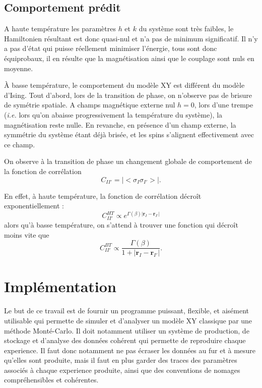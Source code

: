 \documentclass[a4paper, openany, 11pt]{article}
\newcommand{\vr}{\bm{r}}
\begin{document}
\subsection{Comportement prédit}

A haute température les paramètres $h$ et $k$ du système sont très faibles, le Hamiltonien résultant
est donc quasi-nul et n'a pas de minimum significatif. Il n'y a pas d'état qui puisse réellement
minimiser l'énergie, tous sont donc équiprobaux, il en résulte que la magnétisation ainsi que le
couplage sont nuls en moyenne.

À basse température, le comportement du modèle XY est différent du modèle d'Ising. Tout d'abord, lors
de la transition de phase, on n'observe pas de brisure de symétrie spatiale. A champs magnétique
externe nul $h=0$, lors d'une trempe (\emph{i.e.} lors qu'on abaisse progressivement la température du
système), la magnétisation reste nulle. En revanche, en présence d'un champ externe, la symmétrie du
système étant déjà brisée, et les spins s'alignent effectivement avec ce champ. 

On observe à la transition de phase un changement globale de comportement de la fonction de corrélation
\begin{equation}
    C_{II'} = \big|\big< \sigma_I \sigma_{I'} \big>\big|.
\end{equation}

En effet, à haute température, la fonction de corrélation décroît exponentiellement :
\begin{equation}
    C_{II'}^{HT} \propto e^{\Gamma(\beta) |\vr_I - \vr_{I'}|}
\end{equation}
alors qu'à basse température, on s'attend à trouver une fonction qui décroît moins vite que 
\begin{equation}
    C_{II'}^{BT} \propto \frac{\Gamma(\beta)}{1+|\vr_I - \vr_{I'}|}.
\end{equation}



\section{Implémentation}

Le but de ce travail est de fournir un programme puissant, flexible, et aisément utilisable qui
permette de simuler et d'analyser un modèle XY classique par une méthode Monté-Carlo. Il doit
notamment utiliser un système de production, de stockage et d'analyse des données cohérent qui
permette de reproduire chaque experience. Il faut donc notamment ne pas écraser les données au fur
et à mesure qu'elles sont produite, mais il faut en plus garder des traces des paramètres associés à
chaque experience produite, ainsi que des conventions de nomages compréhensibles et cohérentes.
\end{document}
